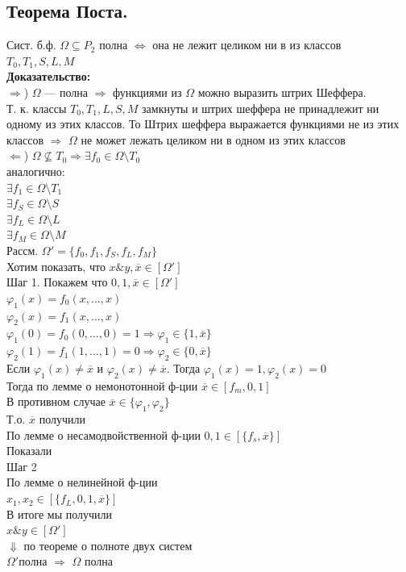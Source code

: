 \documentclass[12pt]{article}
\begin{document}
\subsection{Теорема Поста.}
	Сист. б.ф. $\Omega \subseteq P_2$ полна $\Leftrightarrow$ она не лежит целиком ни в из классов $T_0, T_1, S, L, M$\\
	\textbf{Доказательство:}\\
		$\Rightarrow$) $\Omega$ — полна $\Rightarrow$ функциями из $\Omega$ можно выразить штрих Шеффера.\\
		Т. к. классы $T_0, T_1, L, S, M$ замкнуты и штрих шеффера не принадлежит ни одному из этих классов. То Штрих шеффера выражается функциями не из этих классов $\Rightarrow$ $\Omega$ не может лежать целиком ни в одном из этих классов\\
		$\Leftarrow$) $\Omega \nsubseteq T_0 \Rightarrow \exists f_0 \in \Omega \setminus T_0$\\
		аналогично:\\
		$\exists f_1 \in \Omega \setminus T_1$\\
		$\exists f_S \in \Omega \setminus S$\\
		$\exists f_L \in \Omega \setminus L$\\
		$\exists f_M \in \Omega \setminus M$\\
		Рассм. $\Omega' = \{f_0, f_1, f_S, f_L, f_M\}$\\
		Хотим показать, что $x \& y, \overline{x} \in [\Omega']$\\
		Шаг 1. Покажем что $0,1,\overline{x} \in [\Omega']$\\
		$\varphi_1(x) = f_0(x,\dotsc,x)$\\
		$\varphi_2(x) = f_1(x,\dotsc,x)$\\
		$\varphi_1(0) = f_0(0,\dotsc,0) = 1 \Rightarrow \varphi_1 \in \{1, \overline{x}\}$\\
		$\varphi_2(1) = f_1(1,\dotsc,1) = 0 \Rightarrow \varphi_2 \in \{0, \overline{x}\}$\\
		Если $\varphi_1(x) \neq \overline{x}$ и $\varphi_2(x) \neq \overline{x}$. Тогда $\varphi_1(x) = 1, \varphi_2(x) = 0$\\
		Тогда по лемме о немонотонной ф-ции $\overline{x} \in [f_m, 0, 1]$\\
		В противном случае $\overline{x} \in \{\varphi_1, \varphi_2\}$\\
		Т.о. $\overline{x}$ получили\\
		По лемме о несамодвойственной ф-ции $0,1 \in [\{f_s, \overline{x}\}]$\\
		Показали\\
		Шаг 2\\
		По лемме о нелинейной ф-ции\\
		$x_1, x_2 \in [\{f_L, 0, 1, \overline{x}\}]$\\
		В итоге мы получили\\
		$x \& y \in [\Omega']$\\
		$\Downarrow$ по теореме о полноте двух систем\\
		$\Omega' полна$ $\Rightarrow$ $\Omega$ полна\\
	\qedsymbol
\end{document}
